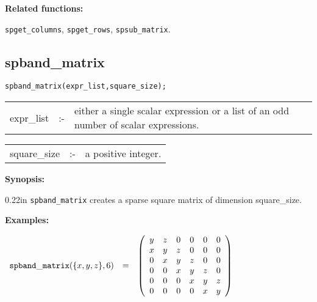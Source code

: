 {\bf Related functions:}

\hspace*{0.175in} {\tt spget\_columns}, {\tt spget\_rows}, 
{\tt spsub\_matrix}.


\subsection{spband\_matrix}

\hspace*{0.175in} {\tt spband\_matrix(expr\_list,square\_size);}

\hspace*{0.1in}
\begin{tabular}{l l l}
expr\_list  \hspace*{0.088in} &:-& \parbox[t]{.72\linewidth}
{either a single scalar expression or a list of an odd number of scalar
expressions.} 
\end{tabular}

\vspace*{0.04in}
\hspace*{0.1in}
\begin{tabular}{l l l}
square\_size &:-& a positive integer.
\end{tabular}

{\bf Synopsis:}

\begin{addtolength}{\leftskip}{0.22in}
                {\tt spband\_matrix} creates a sparse square matrix of 
                dimension square\_size. 

\end{addtolength}

{\bf Examples:}

\begin{flushleft}  
\hspace*{0.1in}
\begin{math}  
\begin{array}{ccc}
{\tt spband\_matrix}(\{x,y,z\},6) & = & 
\left( \begin{array}{cccccc} y & z & 0 & 0 & 0 & 0 \\ x & y & z & 0 & 0
& 0 \\ 0 & x & y & z & 0 & 0 \\ 0 & 0 & x & y & z & 0 \\ 0 & 0 & 0 & x &
 y & z \\ 0 & 0 & 0 & 0 & x & y 
\end{array} \right)
\end{array}  
\end{math}  
\end{flushleft}

